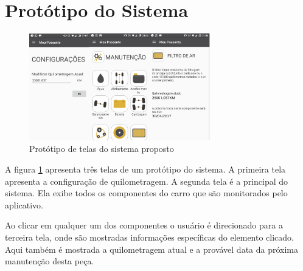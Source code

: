 \documentclass[12pt]{article}
\begin{document}
\section{Protótipo do Sistema}
\begin{figure}[h]
  \centering
  \includegraphics[width=0.7\textwidth]{telas}
  \caption{Protótipo de telas do sistema proposto}
  \label{figura-quilometragem}
\end{figure}

A figura \ref{figura-quilometragem} apresenta três telas de um protótipo do
sistema. A primeira tela apresenta a configuração de quilometragem. A segunda
tela é a principal do sistema. Ela exibe todos os componentes do carro que são
monitorados pelo aplicativo.

Ao clicar em qualquer um dos componentes o usuário
é direcionado para a terceira tela, onde são mostradas informações específicas
do elemento clicado. Aqui também é mostrada a quilometragem atual e a provável
data da próxima manutenção desta peça.


%
\end{document}
